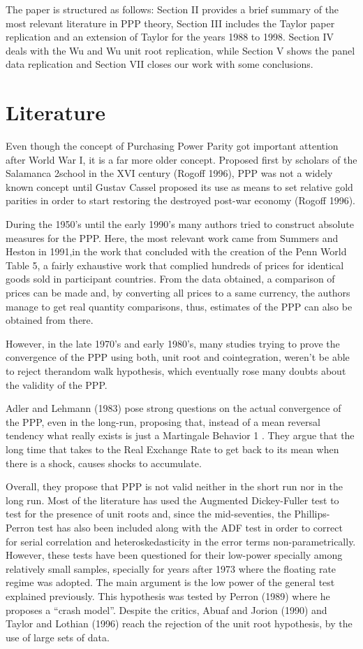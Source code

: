 \documentclass[]{article}
\begin{document}
The paper is structured as follows: Section II provides a brief summary of the most relevant literature in PPP theory, Section III includes the Taylor paper replication and an extension of Taylor for the years 1988 to 1998. Section IV deals with the Wu and Wu unit
root replication, while Section V shows the panel data replication and Section VII closes our work with some conclusions.

\hypertarget{literature}{%
\section{Literature}\label{literature}}

Even though the concept of Purchasing Power Parity got important attention after World War I, it is a far more older concept. Proposed first by scholars of the Salamanca 2school in the XVI century (Rogoff 1996), PPP was not a widely known concept until Gustav Cassel proposed its use as means to set relative gold parities in order to start restoring the destroyed post-war economy (Rogoff 1996).

During the 1950's until the early 1990's many authors tried to construct absolute measures for the PPP. Here, the most relevant work came from Summers and Heston in 1991,in the work that concluded with the creation of the Penn World Table 5, a fairly exhaustive work that complied hundreds of prices for identical goods sold in participant countries. From the data obtained, a comparison of prices can be made and, by converting all prices to a same currency, the authors manage to get real quantity comparisons, thus, estimates of the PPP can also be obtained from there.

However, in the late 1970's and early 1980's, many studies trying to prove the convergence of the PPP using both, unit root and cointegration, weren't be able to reject therandom walk hypothesis, which eventually rose many doubts about the validity of the PPP.

Adler and Lehmann (1983) pose strong questions on the actual convergence of the PPP, even in the long-run, proposing that, instead of a mean reversal tendency what really exists is just a Martingale Behavior 1 . They argue that the long time that takes to the Real
Exchange Rate to get back to its mean when there is a shock, causes shocks to accumulate.

Overall, they propose that PPP is not valid neither in the short run nor in the long run. Most of the literature has used the Augmented Dickey-Fuller test to test for the presence of unit roots and, since the mid-seventies, the Phillips-Perron test has also been included
along with the ADF test in order to correct for serial correlation and heteroskedasticity in the error terms non-parametrically. However, these tests have been questioned for their low-power specially among relatively small samples, specially for years after 1973 where
the floating rate regime was adopted. The main argument is the low power of the general test explained previously. This hypothesis was tested by Perron (1989) where he proposes a ``crash model''. Despite the critics, Abuaf and Jorion (1990) and Taylor and Lothian (1996) reach the rejection of the unit root hypothesis, by the use of large sets of data.
\end{document}
